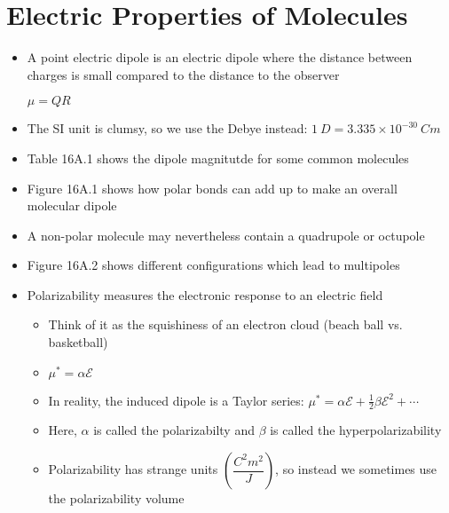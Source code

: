\documentclass[12pt, openany, letterpaper]{memoir}
\begin{document}
\section{Electric Properties of Molecules}
\begin{itemize}
	\item A point electric dipole is an electric dipole where the distance between charges is small compared to the distance to the observer
	
	$\mu = QR$
	\item The SI unit is clumsy, so we use the Debye instead: $1~D=3.335\times10^{-30}~Cm$
	\item Table 16A.1 shows the dipole magnitutde for some common molecules
	\item Figure 16A.1 shows how polar bonds can add up to make an overall molecular dipole
	\item A non-polar molecule may nevertheless contain a quadrupole or octupole
	\item Figure 16A.2 shows different configurations which lead to multipoles
	\item Polarizability measures the electronic response to an electric field
	\begin{itemize}
		\item Think of it as the squishiness of an electron cloud (beach ball vs. basketball)
		\item $\mu^* = \alpha\mathcal{E}$
		\item In reality, the induced dipole is a Taylor series: $\mu^* = \alpha\mathcal{E} + \frac{1}{2}\beta\mathcal{E}^2+\cdots$
		\item Here, $\alpha$ is called the polarizabilty and $\beta$ is called the hyperpolarizability
		\item Polarizability has strange units $\left(\dfrac{C^2m^2}{J}\right)$, so instead we sometimes use the polarizability volume
		

\end{itemize}
\end{itemize}
\end{document}
